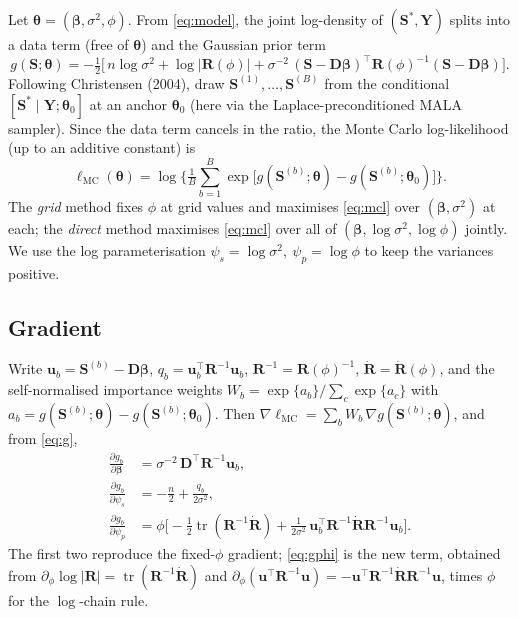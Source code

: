 \documentclass[11pt]{article}
\newcommand{\R}{\mathbf{R}}
\newcommand{\Rp}{\dot{\mathbf{R}}}
\newcommand{\D}{\mathbf{D}}
\newcommand{\Sv}{\mathbf{S}}
\newcommand{\bet}{\bm{\beta}}
\newcommand{\tr}{\operatorname{tr}}
\begin{document}
Let $\bm\theta=(\bet,\sigma^2,\phi)$. From \eqref{eq:model}, the joint
log-density of $(\Sv^\ast,\mathbf{Y})$ splits into a data term (free of
$\bm\theta$) and the Gaussian prior term
\begin{equation}
g(\Sv;\bm\theta)= -\tfrac12\Big[\,n\log\sigma^2 + \log|\R(\phi)|
   + \sigma^{-2}\,(\Sv-\D\bet)^\top \R(\phi)^{-1}(\Sv-\D\bet)\Big].
\label{eq:g}
\end{equation}
Following Christensen (2004), draw $\Sv^{(1)},\dots,\Sv^{(B)}$ from the conditional
$[\Sv^\ast\mid \mathbf{Y};\bm\theta_0]$ at an anchor $\bm\theta_0$ (here via the
Laplace-preconditioned MALA sampler). Since the data term cancels in the ratio,
the Monte Carlo log-likelihood (up to an additive constant) is
\begin{equation}
\ell_{\mathrm{MC}}(\bm\theta)=\log\!\Big\{\tfrac1B\sum_{b=1}^{B}
   \exp\!\big[g(\Sv^{(b)};\bm\theta)-g(\Sv^{(b)};\bm\theta_0)\big]\Big\}.
\label{eq:mcl}
\end{equation}
The \emph{grid} method fixes $\phi$ at grid values and maximises \eqref{eq:mcl}
over $(\bet,\sigma^2)$ at each; the \emph{direct} method maximises \eqref{eq:mcl}
over all of $(\bet,\log\sigma^2,\log\phi)$ jointly. We use the log
parameterisation $\psi_s=\log\sigma^2,\ \psi_p=\log\phi$ to keep the variances
positive.

\subsection{Gradient}
Write $\mathbf{u}_b=\Sv^{(b)}-\D\bet$, $q_b=\mathbf{u}_b^\top\R^{-1}\mathbf{u}_b$,
$\R^{-1}=\R(\phi)^{-1}$, $\Rp=\Rp(\phi)$, and the self-normalised importance
weights $W_b=\exp\{a_b\}/\sum_c\exp\{a_c\}$ with
$a_b=g(\Sv^{(b)};\bm\theta)-g(\Sv^{(b)};\bm\theta_0)$. Then
$\nabla\ell_{\mathrm{MC}}=\sum_b W_b\,\nabla g(\Sv^{(b)};\bm\theta)$, and from
\eqref{eq:g},
\begin{align}
\frac{\partial g_b}{\partial \bet} &= \sigma^{-2}\,\D^\top\R^{-1}\mathbf{u}_b,\\
\frac{\partial g_b}{\partial \psi_s} &= -\tfrac{n}{2}+\frac{q_b}{2\sigma^2},\\
\frac{\partial g_b}{\partial \psi_p} &=
  \phi\Big[-\tfrac12\tr(\R^{-1}\Rp)
  +\tfrac{1}{2\sigma^2}\,\mathbf{u}_b^\top\R^{-1}\Rp\R^{-1}\mathbf{u}_b\Big].
\label{eq:gphi}
\end{align}
The first two reproduce the fixed-$\phi$ gradient; \eqref{eq:gphi} is the new term,
obtained from $\partial_\phi\log|\R|=\tr(\R^{-1}\Rp)$ and
$\partial_\phi(\mathbf{u}^\top\R^{-1}\mathbf{u})
=-\mathbf{u}^\top\R^{-1}\Rp\R^{-1}\mathbf{u}$, times $\phi$ for the
$\log$-chain rule.
\end{document}
